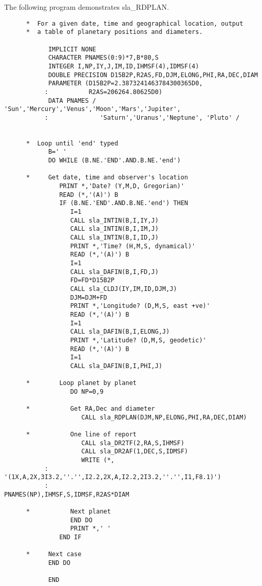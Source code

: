 \documentclass[11pt,twoside]{article}
\begin{document}
The following program demonstrates
sla\_RDPLAN.
\begin{verbatim}
      *  For a given date, time and geographical location, output
      *  a table of planetary positions and diameters.

            IMPLICIT NONE
            CHARACTER PNAMES(0:9)*7,B*80,S
            INTEGER I,NP,IY,J,IM,ID,IHMSF(4),IDMSF(4)
            DOUBLE PRECISION D15B2P,R2AS,FD,DJM,ELONG,PHI,RA,DEC,DIAM
            PARAMETER (D15B2P=2.3873241463784300365D0,
           :           R2AS=206264.80625D0)
            DATA PNAMES / 'Sun','Mercury','Venus','Moon','Mars','Jupiter',
           :              'Saturn','Uranus','Neptune', 'Pluto' /


      *  Loop until 'end' typed
            B=' '
            DO WHILE (B.NE.'END'.AND.B.NE.'end')

      *     Get date, time and observer's location
               PRINT *,'Date? (Y,M,D, Gregorian)'
               READ (*,'(A)') B
               IF (B.NE.'END'.AND.B.NE.'end') THEN
                  I=1
                  CALL sla_INTIN(B,I,IY,J)
                  CALL sla_INTIN(B,I,IM,J)
                  CALL sla_INTIN(B,I,ID,J)
                  PRINT *,'Time? (H,M,S, dynamical)'
                  READ (*,'(A)') B
                  I=1
                  CALL sla_DAFIN(B,I,FD,J)
                  FD=FD*D15B2P
                  CALL sla_CLDJ(IY,IM,ID,DJM,J)
                  DJM=DJM+FD
                  PRINT *,'Longitude? (D,M,S, east +ve)'
                  READ (*,'(A)') B
                  I=1
                  CALL sla_DAFIN(B,I,ELONG,J)
                  PRINT *,'Latitude? (D,M,S, geodetic)'
                  READ (*,'(A)') B
                  I=1
                  CALL sla_DAFIN(B,I,PHI,J)

      *        Loop planet by planet
                  DO NP=0,9

      *           Get RA,Dec and diameter
                     CALL sla_RDPLAN(DJM,NP,ELONG,PHI,RA,DEC,DIAM)

      *           One line of report
                     CALL sla_DR2TF(2,RA,S,IHMSF)
                     CALL sla_DR2AF(1,DEC,S,IDMSF)
                     WRITE (*,
           : '(1X,A,2X,3I3.2,''.'',I2.2,2X,A,I2.2,2I3.2,''.'',I1,F8.1)')
           :                          PNAMES(NP),IHMSF,S,IDMSF,R2AS*DIAM

      *           Next planet
                  END DO
                  PRINT *,' '
               END IF

      *     Next case
            END DO

            END
\end{verbatim}
\end{document}
